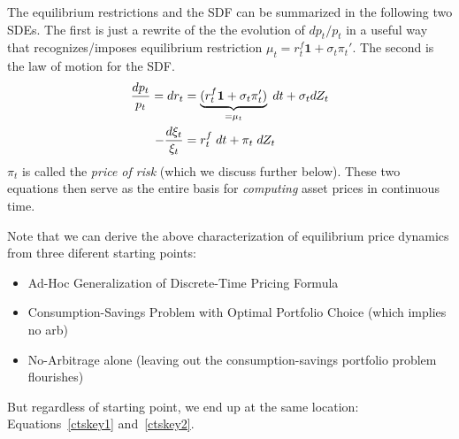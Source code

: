 \documentclass[12pt]{article}
\theoremstyle{plain}
\theoremstyle{definition}
\theoremstyle{remark}
\begin{document}
The equilibrium restrictions and the SDF can be summarized in the
following two SDEs. The first is just a rewrite of the the evolution of
$dp_t/p_t$ in a useful way that recognizes/imposes equilibrium
restriction $\mu_t=r_t^f\mathbf{1}+\sigma_t\pi_t'$.
The second is the law of motion for the SDF.
\begin{align}
  \frac{dp_t}{p_t}
  =
  dr_t
  &=
  \underbrace{%
    (r_t^f\mathbf{1}+\sigma_t\pi_t')
  }_{=\mu_t}
  \;dt
  +
  \sigma_t
  dZ_t
  \label{ctskey1}
  \\
  -
  \frac{d\xi_t}{\xi_t}
  &=
  r_t^f\;dt + \pi_t \;dZ_t
  \label{ctskey2}
\end{align}
$\pi_t$ is called the \emph{price of risk} (which we discuss further
below).
These two equations then serve as the entire basis for \emph{computing}
asset prices in continuous time.

\clearpage
Note that we can derive the above characterization of equilibrium price
dynamics from three diferent starting points:
\begin{itemize}
  \item Ad-Hoc Generalization of Discrete-Time Pricing Formula
  \item Consumption-Savings Problem with Optimal Portfolio Choice
    (which implies no arb)
  \item No-Arbitrage alone (leaving out the consumption-savings
    portfolio problem flourishes)
\end{itemize}
But regardless of starting point, we end up at the same location:
Equations~\ref{ctskey1} and~\ref{ctskey2}.
\end{document}
